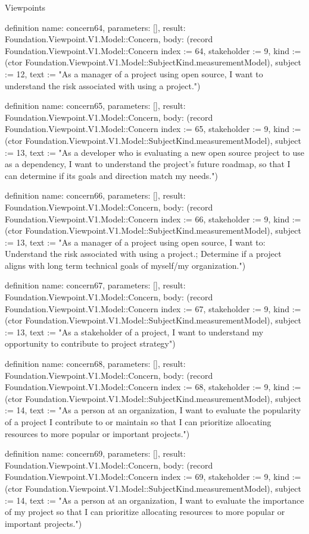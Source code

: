\begin{lexlean}{Viewpoints}
\begin{semanticmodule}
definition{
  name: concern64,
  parameters: [],
  result: Foundation.Viewpoint.V1.Model::Concern,
  body: (record Foundation.Viewpoint.V1.Model::Concern {index := 64, stakeholder := 9, kind := (ctor Foundation.Viewpoint.V1.Model::SubjectKind.measurementModel), subject := 12, text := "As a manager of a project using open source, I want to understand the risk associated with using a project."})
}

definition{
  name: concern65,
  parameters: [],
  result: Foundation.Viewpoint.V1.Model::Concern,
  body: (record Foundation.Viewpoint.V1.Model::Concern {index := 65, stakeholder := 9, kind := (ctor Foundation.Viewpoint.V1.Model::SubjectKind.measurementModel), subject := 13, text := "As a developer who is evaluating a new open source project to use as a dependency, I want to understand the project's future roadmap, so that I can determine if its goals and direction match my needs."})
}

definition{
  name: concern66,
  parameters: [],
  result: Foundation.Viewpoint.V1.Model::Concern,
  body: (record Foundation.Viewpoint.V1.Model::Concern {index := 66, stakeholder := 9, kind := (ctor Foundation.Viewpoint.V1.Model::SubjectKind.measurementModel), subject := 13, text := "As a manager of a project using open source, I want to: Understand the risk associated with using a project.; Determine if a project aligns with long term technical goals of myself/my organization."})
}

definition{
  name: concern67,
  parameters: [],
  result: Foundation.Viewpoint.V1.Model::Concern,
  body: (record Foundation.Viewpoint.V1.Model::Concern {index := 67, stakeholder := 9, kind := (ctor Foundation.Viewpoint.V1.Model::SubjectKind.measurementModel), subject := 13, text := "As a stakeholder of a project, I want to understand my opportunity to contribute to project strategy"})
}

definition{
  name: concern68,
  parameters: [],
  result: Foundation.Viewpoint.V1.Model::Concern,
  body: (record Foundation.Viewpoint.V1.Model::Concern {index := 68, stakeholder := 9, kind := (ctor Foundation.Viewpoint.V1.Model::SubjectKind.measurementModel), subject := 14, text := "As a person at an organization, I want to evaluate the popularity of a project I contribute to or maintain so that I can prioritize allocating resources to more popular or important projects."})
}

definition{
  name: concern69,
  parameters: [],
  result: Foundation.Viewpoint.V1.Model::Concern,
  body: (record Foundation.Viewpoint.V1.Model::Concern {index := 69, stakeholder := 9, kind := (ctor Foundation.Viewpoint.V1.Model::SubjectKind.measurementModel), subject := 14, text := "As a person at an organization, I want to evaluate the importance of my project so that I can prioritize allocating resources to more popular or important projects."})
}


\end{semanticmodule}
\end{lexlean}
